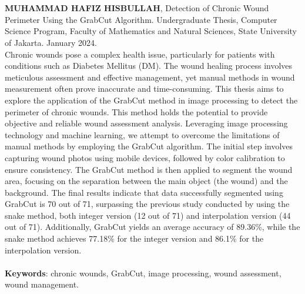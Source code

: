 \chapter*{}
\singlespacing{}

\textbf{MUHAMMAD HAFIZ HISBULLAH}, Detection of Chronic Wound Perimeter Using the 
GrabCut Algorithm. Undergraduate Thesis, Computer Science Program, Faculty of 
Mathematics and Natural Sciences, State University of Jakarta. January 2024.
\\

Chronic wounds pose a complex health issue, particularly for patients with conditions 
such as Diabetes Mellitus (DM). The wound healing process involves meticulous assessment 
and effective management, yet manual methods in wound measurement often prove inaccurate 
and time-consuming. This thesis aims to explore the application of the GrabCut method 
in image processing to detect the perimeter of chronic wounds. This method holds 
the potential to provide objective and reliable wound assessment analysis. Leveraging 
image processing technology and machine learning, we attempt to overcome the limitations 
of manual methods by employing the GrabCut algorithm. The initial step involves 
capturing wound photos using mobile devices, followed by color calibration to ensure 
consistency. The GrabCut method is then applied to segment the wound area, focusing 
on the separation between the main object (the wound) and the background. The final results 
indicate that data successfully segmented using GrabCut is 70 out of 71, 
surpassing the previous study conducted by \cite{Rizki:2022} using the snake method, 
both integer version (12 out of 71) and interpolation version (44 out of 71). 
Additionally, GrabCut yields an average accuracy of 89.36\%, while the snake method 
achieves 77.18\% for the integer version and 86.1\% for the interpolation version.
\\
\\
\textbf{Keywords}: chronic wounds, GrabCut, image processing, wound assessment, wound management.
